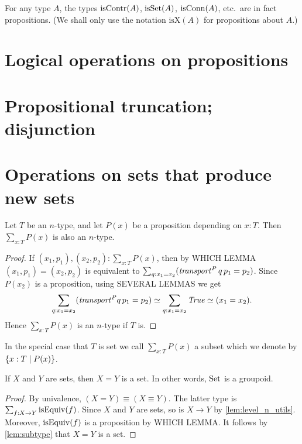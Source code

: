 \begin{lemma}\label{lem:props-are-props}
  For any type $A$, the types $\mathrm{isContr}(A)$, $\mathrm{isSet}(A)$, $\mathrm{isConn}(A)$, etc.\ are in fact propositions.
  (We shall only use the notation $\mathrm{isX}(A)$ for propositions about $A$.)
\end{lemma}
\section{Logical operations on propositions}
\label{sec:logical-operations}

\section{Propositional truncation; disjunction}
\label{sec:propositional-truncation}

\section{Operations on sets that produce new sets}
\label{sec:operations-on-sets}

\begin{lemma}\label{lem:subtype}
Let $T$ be an $n$-type, and let $P(x)$ be a proposition depending on $x:T$. 
Then $\sum_{x:T} P(x)$ is also an $n$-type.
\end{lemma}

\begin{proof}
If $(x_1,p_1),(x_2,p_2) : \sum_{x:T} P(x)$, then by WHICH LEMMA
$(x_1,p_1)=(x_2,p_2)$ is equivalent to 
$\sum_{q:x_1=x_2} (\mathop{\mathit{transport}}^P q\,p_1 = p_2)$. 
Since $P(x_2)$ is a proposition, using SEVERAL LEMMAS we get 
\[
\sum_{q:x_1=x_2} ({\mathop{\mathit{transport}}}^P q\,p_1 = p_2) \simeq 
\sum_{q:x_1=x_2} \mathop{\mathit{True}} \simeq (x_1=x_2).
\]
Hence $\sum_{x:T} P(x)$ is an $n$-type if $T$ is.
\end{proof}
In the special case that $T$ is set we call 
$\sum_{x:T} P(x)$ a subset which we denote by 
$\{x:T \mid P(x)\}$.

\begin{lemma}\label{lem:eq_of_sets_is_set}
If $X$ and $Y$ are sets, then $X=Y$ is a set. 
In other words, $\mathord{\mathrm{Set}}$ is a groupoid.
\end{lemma}

\begin{proof}
By univalence, $(X=Y) \equiv (X\equiv Y)$. The latter type is
$\sum_{f:X\to Y} \mathrm{isEquiv}(f)$. Since $X$ and $Y$ are sets,
so is $X\to Y$ by \cref{lem:level_n_utils}. Moreover,
$\mathrm{isEquiv}(f)$ is a proposition by WHICH LEMMA.
It follows by \cref{lem:subtype} that $X=Y$ is a set.  
\end{proof}


